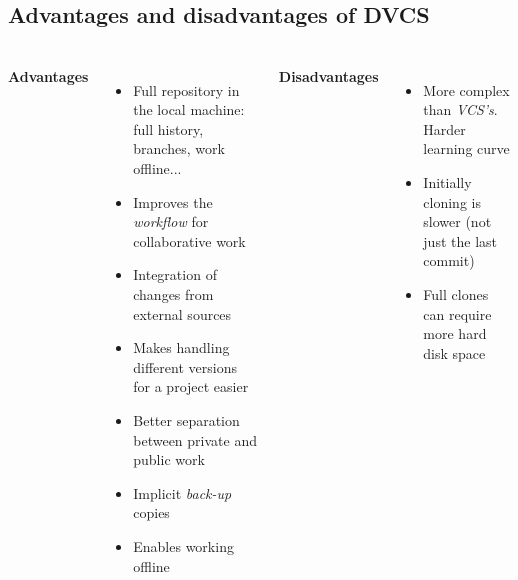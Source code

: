 \begin{frame}
\begin{center}
  \end{center}
\end{frame}


\subsection{Advantages and disadvantages of DVCS}
\begin{frame}
  \frametitle{\insertsubsection}

  \begin{columns}[t]
    \textbf{Advantages}
    \begin{itemize}
    \item Full repository in the local machine: full history,
      branches, work offline...
    \item Improves the \textit{workflow} for collaborative work
    \item Integration of changes from external sources
    \item Makes handling different versions for a project easier
    \item Better separation between private and public work
    \item Implicit \textit{back-up} copies
    \item Enables working offline
    \end{itemize}

    \textbf{Disadvantages}
    \begin{itemize}
    \item More complex than \textit{VCS's}. Harder learning curve
    \item Initially cloning is slower (not just the last commit)
    \item Full clones can require more hard disk space
  \end{itemize}

  \end{columns}
\end{frame}

